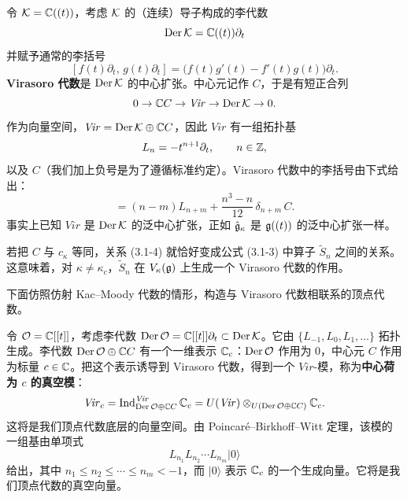 令 $\mathcal{K}=\mathbb{C}((t))$，考虑 $\mathcal{K}$ 的（连续）导子构成的李代数
\[
    \operatorname{Der}\mathcal{K} = \mathbb{C}((t))\partial_t
\]
并赋予通常的李括号
\[
    [f(t)\partial_t,\, g(t)\partial_t] = \bigl(f(t)g'(t)-f'(t)g(t)\bigr)\partial_t .
\]
\textbf{Virasoro 代数}是 $\operatorname{Der}\mathcal{K}$ 的中心扩张。中心元记作 $C$，于是有短正合列
\[
    0\to \mathbb{C} C \to \mathit{Vir} \to \operatorname{Der}\mathcal{K} \to 0 .
\]
作为向量空间，$\mathit{Vir}=\operatorname{Der}\mathcal{K}\oplus\mathbb{C} C$，因此 $\mathit{Vir}$ 有一组拓扑基
\[
    L_n = -t^{n+1}\partial_t, \qquad n\in\mathbb{Z},
\]
以及 $C$（我们加上负号是为了遵循标准约定）。Virasoro 代数中的李括号由下式给出：
\begin{equation}
    [L_n, L_m] = (n-m)L_{n+m} + \frac{n^3-n}{12}\,\delta_{n+m}\,C.
    \tag{3.1-4}
\end{equation}
事实上已知 $\mathit{Vir}$ 是 $\operatorname{Der}\mathcal{K}$ 的泛中心扩张，正如 $\hat{\mathfrak{g}}_\kappa$ 是 $\mathfrak{g}((t))$ 的泛中心扩张一样。


若把 $C$ 与 $c_\kappa$ 等同，关系 (3.1-4) 就恰好变成公式 (3.1-3) 中算子 $\widetilde S_n$ 之间的关系。这意味着，对 $\kappa\neq\kappa_c$，$\widetilde S_n$ 在 $V_\kappa(\mathfrak{g})$ 上生成一个 Virasoro 代数的作用。

下面仿照仿射 Kac--Moody 代数的情形，构造与 Virasoro 代数相联系的顶点代数。

令 $\mathcal{O}=\mathbb{C}[[t]]$，考虑李代数 $\operatorname{Der}\mathcal{O}=\mathbb{C}[[t]]\partial_t\subset\operatorname{Der}\mathcal{K}$。它由 $\{L_{-1},L_0,L_1,\dots\}$ 拓扑生成。李代数 $\operatorname{Der}\mathcal{O}\oplus\mathbb{C} C$ 有一个一维表示 $\mathbb{C}_c$：$\operatorname{Der}\mathcal{O}$ 作用为 $0$，中心元 $C$ 作用为标量 $c\in\mathbb{C}$。把这个表示诱导到 Virasoro 代数，得到一个 $\mathit{Vir}$-模，称为\textbf{中心荷为 $c$ 的真空模}：
\[
    \mathit{Vir}_c = \operatorname{Ind}_{\operatorname{Der}\mathcal{O}\oplus\mathbb{C} C}^{\mathit{Vir}}\mathbb{C}_c
    = U(\mathit{Vir})\otimes_{U(\operatorname{Der}\mathcal{O}\oplus\mathbb{C} C)}\mathbb{C}_c .
\]
这将是我们顶点代数底层的向量空间。由 Poincaré--Birkhoff--Witt 定理，该模的一组基由单项式
\[
    L_{n_1}L_{n_2}\cdots L_{n_m}|0\rangle
\]
给出，其中 $n_1\le n_2\le\cdots\le n_m<-1$，而 $|0\rangle$ 表示 $\mathbb{C}_c$ 的一个生成向量。它将是我们顶点代数的真空向量。

